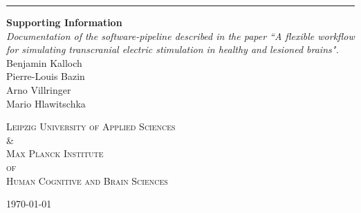 \begin{titlepage}
    \raggedleft %
    
    \rule{1pt}{0.70\textheight}     %
    \hspace{0.05\textwidth}         %
    \parbox[b]{0.70\textwidth}{     %
        {\Huge\bfseries Supporting Information}\\[2\baselineskip] %
        {\large\textit{Documentation of the software-pipeline described in the paper ``A flexible workflow for simulating transcranial electric stimulation in healthy and lesioned brains".}}\\[4\baselineskip] %
        {Benjamin Kalloch}\\
        {Pierre-Louis Bazin}\\
        {Arno Villringer}\\
        {Mario Hlawitschka} 
        
        \vspace{0.15\textheight} %
    }
   \begin{center}
      {\noindent \textsc{Leipzig University of Applied Sciences \\\&\\ Max Planck Institute\\of\\Human Cognitive and Brain Sciences}} %
   \end{center}
   \vspace{0.05\textheight} %
   
   \begin{center}
      {\today}
   \end{center}
\end{titlepage}
